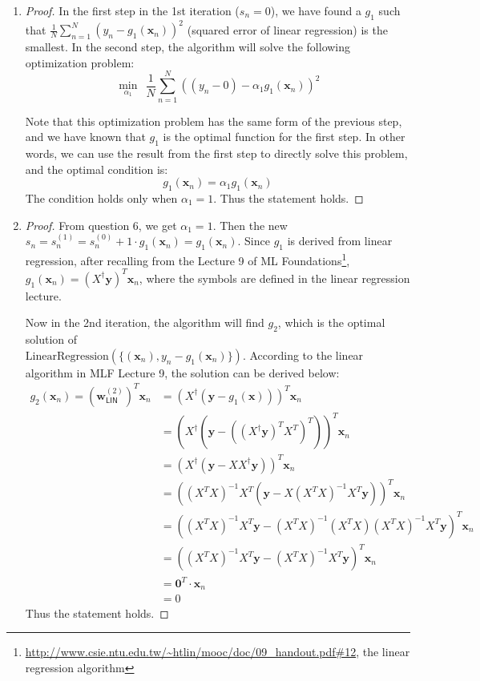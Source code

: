 \documentclass[11pt]{article}
\begin{document}
\begin{enumerate}[label=\textbf{\arabic*}.]
  \item \begin{proof}In the first step in the 1st iteration ($s_n = 0$), we have found a $g_1$ such that $\frac{1}{N} \sum_{n=1}^N (y_n - g_1(\mathbf{x}_n))^2$ (squared error of linear regression) is the smallest. In the second step, the algorithm will solve the following optimization problem:
  \[\underset{\alpha_1}{\min}\ \ \frac{1}{N} \sum_{n=1}^N ((y_n-0) -\alpha_1 g_1(\mathbf{x}_n))^2\]

  Note that this optimization problem has the same form of the previous step, and we have known that $g_1$ is the optimal function for the first step. In other words, we can use the result from the first step to directly solve this problem, and the optimal condition is:
  \[g_1(\mathbf{x}_n) = \alpha_1 g_1(\mathbf{x}_n)\]
  The condition holds only when $\alpha_1 = 1$. Thus the statement holds.

  \end{proof}

  \item \begin{proof}From question 6, we get $\alpha_1 = 1$. Then the new $s_n = s_n^{(1)} = s_n^{(0)} + 1\cdot g_1(\mathbf{x}_n) = g_1(\mathbf{x}_n)$. Since $g_1$ is derived from linear regression, after recalling from the Lecture 9 of ML Foundations\footnote{\url{http://www.csie.ntu.edu.tw/~htlin/mooc/doc/09_handout.pdf\#12}, the linear regression algorithm}, $g_1(\mathbf{x}_n) = (X^\dag\mathbf{y})^T\mathbf{x}_n$, where the symbols are defined in the linear regression lecture.\par
  Now in the 2nd iteration, the algorithm will find $g_2$, which is the optimal solution of \\ $\text{LinearRegression}(\{(\mathbf{x}_n), y_n - g_1(\mathbf{x}_n)\})$. According to the linear algorithm in MLF Lecture 9, the solution can be derived below:
  \[\begin{aligned}g_2(\mathbf{x}_n) = (\mathbf{w}_{\mathsf{LIN}}^{(2)})^T\mathbf{x}_n &= \left(X^\dag (\mathbf{y} - g_1(\mathbf{x}))\right)^T \mathbf{x}_n \\
   &= \left(X^\dag (\mathbf{y} - ((X^\dag\mathbf{y})^T X^T)^T )\right)^T \mathbf{x}_n \\
   &= \left(X^\dag (\mathbf{y} - XX^\dag\mathbf{y}) \right)^T \mathbf{x}_n \\
   &= \left((X^TX)^{-1}X^T (\mathbf{y} - X(X^TX)^{-1}X^T\mathbf{y}) \right)^T \mathbf{x}_n \\
   &= \left((X^TX)^{-1}X^T \mathbf{y} - (X^TX)^{-1}(X^T X)(X^TX)^{-1}X^T\mathbf{y} \right)^T \mathbf{x}_n \\
   &= \left((X^TX)^{-1}X^T \mathbf{y} - (X^TX)^{-1}X^T\mathbf{y} \right)^T \mathbf{x}_n \\
   &= \mathbf{0}^T\cdot \mathbf{x}_n \\
   &= 0
   \end{aligned}\]
   Thus the statement holds.


\end{proof}
\end{enumerate}
\end{document}
